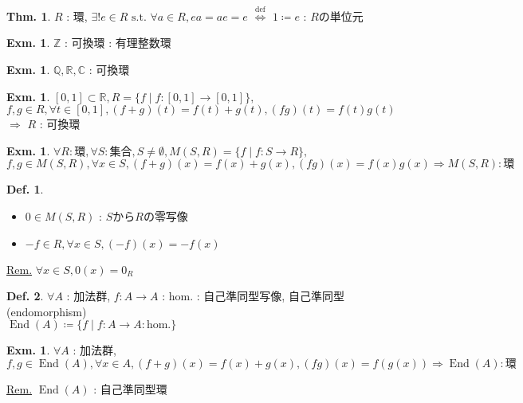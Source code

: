 \documentclass[uplatex,dvipdfmx,9pt]{beamer}
\newcommand{\defarrow}{\overset{\mathrm{def}}{\Leftrightarrow}}
\newcommand{\st}{\text{ s.t. }}
\newcommand{\End}{\operatorname{End}}
\newcounter{textExmCount}
\theoremstyle{definition} %
\newtheorem{defn}{Def.}[subsection] %
\newtheorem{thm}{Thm.}[subsection] %
\theoremstyle{example}
\newtheorem{exmText}[textExmCount]{Exm.}
\begin{document}
      \begin{frame}
        
        \begin{thm}
          $R$ : 環, $\exists! e \in R \st \forall a \in R, ea = ae = e$ $\defarrow$ $1 \coloneqq e$ : $R$の\alert{単位元}
        \end{thm}

        \begin{exmText}
          $\mathbb{Z}$ : 可換環 : \alert{有理整数環}
        \end{exmText}

        \begin{exmText}
          $\mathbb{Q}, \mathbb{R}, \mathbb{C}$ : 可換環
        \end{exmText}

        \begin{exmText}
          $[0, 1] \subset \mathbb{R}, R = \{f \mid f\colon [0, 1] \to [0, 1]\},$ \\
          $f, g \in R, \forall t \in [0, 1], (f + g)(t) = f(t) + g(t), (fg)(t) = f(t)g(t)$ $\Rightarrow$ $R$ : 可換環
        \end{exmText}

      \end{frame}

      \begin{frame}

        \begin{exmText}
          $\forall R : \text{環}, \forall S : \text{集合}, S \ne \emptyset, M(S, R) = \{f \mid f\colon S \to R\},$ \\
          $f, g \in M(S, R), \forall x \in S, (f + g)(x) = f(x) + g(x), (fg)(x) = f(x)g(x) \Rightarrow M(S, R) : \text{環}$
        \end{exmText}

        \begin{defn}
          \begin{itemize}
            \item $0 \in M(S, R)$ : $S$から$R$の\alert{零写像}
            \item $-f \in R, \forall x \in S, (-f)(x) = -f(x)$
          \end{itemize}
        \end{defn}
        \underline{Rem.} $\forall x \in S, 0(x) = 0_R$

        \begin{defn}
          $\forall A$ : 加法群, $f\colon A \to A$ : hom. : \alert{自己準同型写像, 自己準同型}(endomorphism) \\
          $\End(A) \coloneqq \{f \mid f\colon A \to A : \text{hom.}\}$
        \end{defn}

        \begin{exmText}
          $\forall A$ : 加法群, \\
          $f, g \in \End(A), \forall x \in A, (f + g)(x) = f(x) + g(x), (fg)(x) = f(g(x)) \Rightarrow \End(A) : \text{環}$
        \end{exmText}
        \underline{Rem.} $\End(A)$ : \alert{自己準同型環}
        
      \end{frame}
\end{document}
